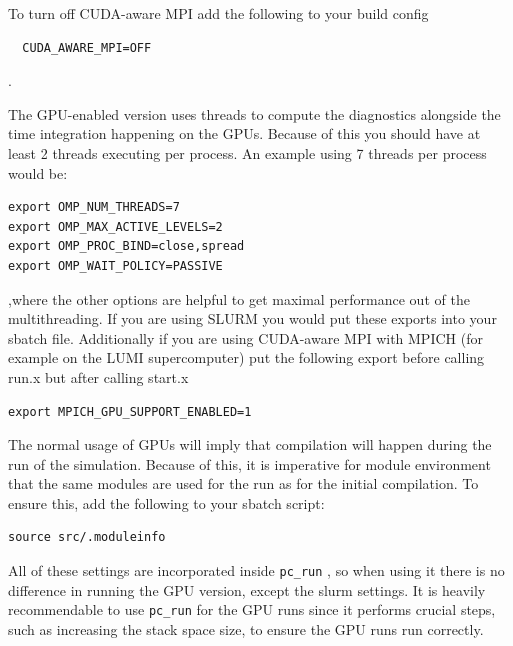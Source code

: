 \documentclass[\mydriver,12pt,twoside,notitlepage,a4paper]{article}
\makeatletter
\newcommand{\code}[1]{\texttt{#1}}
\newcommand{\cmd}{\command}
\newcommand{\command}[2][]{%
  \def\index@{#1}%
  \code{#2}%
  \ifx\index@\@empty\index{#2@\emph{#2}}%
  \else\index{#1@\emph{#1}}%
  \fi%
}
\makeatother
\begin{document}
To turn off CUDA-aware MPI add the following to your build config
\begin{verbatim}
  CUDA_AWARE_MPI=OFF
\end{verbatim}
.

The GPU-enabled version uses threads to compute the diagnostics alongside the time integration happening on the GPUs.
Because of this you should have at least 2 threads executing per process.
An example using 7 threads per process would be:
\begin{verbatim}
export OMP_NUM_THREADS=7
export OMP_MAX_ACTIVE_LEVELS=2
export OMP_PROC_BIND=close,spread
export OMP_WAIT_POLICY=PASSIVE
\end{verbatim}
,where the other options are helpful to get maximal performance out of the multithreading.
If you are using SLURM you would put these exports into your sbatch file. 
Additionally if you are using CUDA-aware MPI with MPICH (for example on the LUMI supercomputer) put the following export before calling run.x but after calling start.x
\begin{verbatim}
export MPICH_GPU_SUPPORT_ENABLED=1
\end{verbatim}

The normal usage of GPUs will imply that compilation will happen during the run of the simulation.
Because of this, it is imperative for module environment that the same modules are used for the run as for the initial compilation.
To ensure this, add the following to your sbatch script:
\begin{verbatim}
source src/.moduleinfo
\end{verbatim}

All of these settings are incorporated inside \cmd{pc_run}, so when using it
there is no difference in running the GPU version, except the slurm settings.
It is heavily recommendable to use \cmd{pc_run} for the GPU runs since it performs crucial steps, such as increasing the stack space size, to ensure the GPU runs
run correctly.
\end{document}
